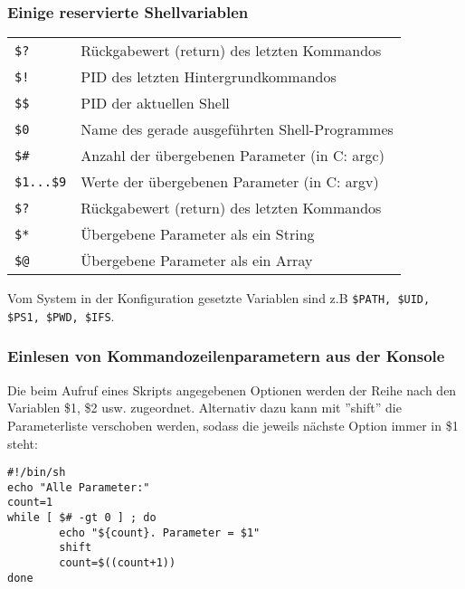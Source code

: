 \documentclass[11pt]{article}
\begin{document}
\subsubsection{Einige reservierte Shellvariablen}
\begin{tabular}{|l|l|}
\hline
\texttt{\$?} & Rückgabewert (return) des letzten Kommandos\\
\texttt{\$!} & PID des letzten Hintergrundkommandos\\
\texttt{\$\$} & PID der aktuellen Shell\\
\texttt{\$0} & Name des gerade ausgeführten Shell-Programmes\\
\texttt{\$\#} & Anzahl der übergebenen Parameter (in C: argc)\\
\texttt{\$1...\$9} & Werte der übergebenen Parameter (in C: argv)\\
\texttt{\$?} & Rückgabewert (return) des letzten Kommandos\\
\texttt{\$*} & Übergebene Parameter als ein String\\
\texttt{\$\makeatletter @} & Übergebene Parameter als ein Array\\
\hline
\end{tabular} 

Vom System in der Konfiguration gesetzte Variablen sind z.B
\texttt{\$PATH, \$UID, \$PS1, \$PWD, \$IFS}.

\subsubsection{Einlesen von Kommandozeilenparametern aus der Konsole}
Die beim Aufruf eines Skripts angegebenen Optionen werden der Reihe nach
den Variablen \$1, \$2 usw. zugeordnet. Alternativ dazu kann mit ''shift''
die Parameterliste verschoben werden, sodass die jeweils nächste Option
immer in \$1 steht:
\begin{verbatim}
#!/bin/sh
echo "Alle Parameter:"
count=1
while [ $# -gt 0 ] ; do
        echo "${count}. Parameter = $1"
        shift
        count=$((count+1))
done
\end{verbatim}
\end{document}
